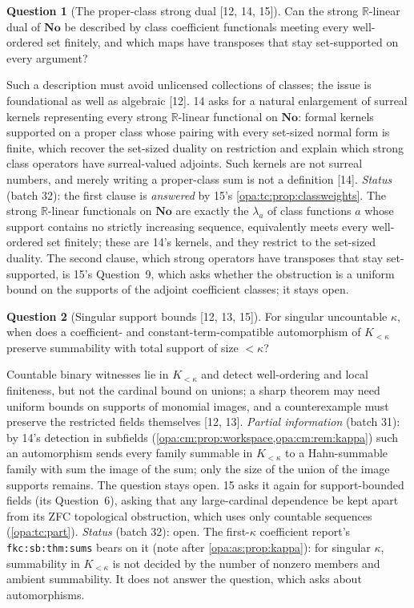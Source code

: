 \documentclass[11pt,oneside]{article}
\numberwithin{equation}{section}
\theoremstyle{definition}
\newtheorem{question}[question]{Question}
\theoremstyle{remark}
\newcommand{\No}{\mathbf{No}}
\newcommand{\R}{\mathbb R}
\newcommand{\src}[1]{\textup{\textsf{\small[#1]}}}
\newcommand{\lbl}[1]{\nolinkurl{#1}}
\begin{document}
\begin{question}[The proper-class strong dual \src{12, 14, 15}]\label{opa:as:q:classdual}
Can the strong $\R$-linear dual of $\No$ be described by class coefficient functionals meeting every well-ordered set
finitely, and which maps have transposes that stay set-supported on every argument?
\end{question}
Such a description must avoid unlicensed collections of classes; the issue is foundational as well as algebraic
\src{12}. 14 asks for a natural enlargement of surreal kernels representing every strong $\R$-linear functional on
$\No$: formal kernels supported on a proper class whose pairing with every set-sized normal form is finite, which
recover the set-sized duality on restriction and explain which strong class operators have surreal-valued adjoints.
Such kernels are not surreal numbers, and merely writing a proper-class sum is not a definition \src{14}.
\emph{Status} (batch 32): the first clause is \emph{answered} by 15's \cref{opa:tc:prop:classweights}. The strong
$\R$-linear functionals on $\No$ are exactly the $\lambda_a$ of class functions $a$ whose support contains no strictly
increasing sequence, equivalently meets every well-ordered set finitely; these are 14's kernels, and they restrict to
the set-sized duality. The second clause, which strong operators have transposes that stay set-supported, is 15's
Question~9, which asks whether the obstruction is a uniform bound on the supports of the adjoint coefficient classes;
it stays open.

\begin{question}[Singular support bounds \src{12, 13, 15}]\label{opa:as:q:singular}
For singular uncountable $\kappa$, when does a coefficient- and constant-term-compatible automorphism of
$K_{<\kappa}$ preserve summability with total support of size $<\kappa$?
\end{question}
Countable binary witnesses lie in $K_{<\kappa}$ and detect well-ordering and local finiteness, but not the cardinal
bound on unions; a sharp theorem may need uniform bounds on supports of monomial images, and a counterexample must
preserve the restricted fields themselves \src{12, 13}. \emph{Partial information} (batch 31): by 14's detection in
subfields (\cref{opa:cm:prop:workspace,opa:cm:rem:kappa}) such an automorphism sends every family summable in
$K_{<\kappa}$ to a Hahn-summable family with sum the image of the sum; only the size of the union of the image
supports remains. The question stays open. 15 asks it again for support-bounded fields (its Question~6),
asking that any large-cardinal dependence be kept apart from its ZFC topological obstruction, which uses only
countable sequences (\cref{opa:tc:part}). \emph{Status} (batch 32): open. The first-$\kappa$ coefficient
report's \lbl{fkc:sb:thm:sums} bears on it (note after \cref{opa:as:prop:kappa}): for singular $\kappa$,
summability in $K_{<\kappa}$ is not decided by the number of nonzero members and ambient summability. It does not
answer the question, which asks about automorphisms.
\end{document}
